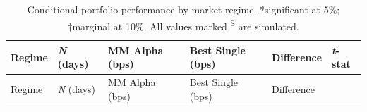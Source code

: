 \documentclass[
  11pt,
  a4paper,
]{article}
\begin{document}
\begin{longtable}[]{@{}
  >{\raggedright\arraybackslash}p{}
  >{\centering\arraybackslash}p{}
  >{\centering\arraybackslash}p{}
  >{\centering\arraybackslash}p{}
  >{\centering\arraybackslash}p{}
  >{\centering\arraybackslash}p{}@{}}
\caption{Conditional portfolio performance by market regime.
*significant at 5\%; †marginal at 10\%. All values marked
\textsuperscript{S} are
simulated.}\label{tbl-conditional}\tabularnewline
\toprule\noalign{}
\begin{minipage}[b]{\linewidth}\raggedright
Regime
\end{minipage} & \begin{minipage}[b]{\linewidth}\centering
\emph{N} (days)
\end{minipage} & \begin{minipage}[b]{\linewidth}\centering
MM Alpha (bps)
\end{minipage} & \begin{minipage}[b]{\linewidth}\centering
Best Single (bps)
\end{minipage} & \begin{minipage}[b]{\linewidth}\centering
Difference
\end{minipage} & \begin{minipage}[b]{\linewidth}\centering
\emph{t}-stat
\end{minipage} \\
\midrule\noalign{}
\endfirsthead
\toprule\noalign{}
\begin{minipage}[b]{\linewidth}\raggedright
Regime
\end{minipage} & \begin{minipage}[b]{\linewidth}\centering
\emph{N} (days)
\end{minipage} & \begin{minipage}[b]{\linewidth}\centering
MM Alpha (bps)
\end{minipage} & \begin{minipage}[b]{\linewidth}\centering
Best Single (bps)
\end{minipage} & \begin{minipage}[b]{\linewidth}\centering
Difference
\end{minipage} & \begin{minipage}[b]{\linewidth}\centering

\end{minipage}
\end{longtable}
\end{document}
